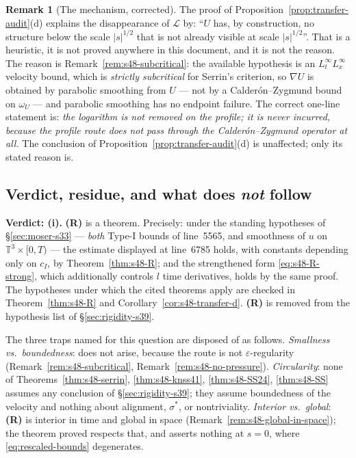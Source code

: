 \documentclass[11pt]{article}
\theoremstyle{definition}
\newtheorem{remark}[theorem]{Remark}
\theoremstyle{remark}
\newcommand{\T}{\mathbb{T}}
\begin{document}
\begin{remark}[The mechanism, corrected]\label{rem:s48-mechanism}
  The proof of Proposition~\ref{prop:transfer-audit}(d) explains the
  disappearance of $\mathcal{L}$ by: ``$U$ has, by construction, no structure
  below the scale $|s|^{1/2}$ that is not already visible at scale
  $|s|^{1/2}$''. That is a heuristic, it is not proved anywhere in this
  document, and it is not the reason. The reason is
  Remark~\ref{rem:s48-subcritical}: the available hypothesis is an
  $L^\infty_{t}L^\infty_{x}$ velocity bound, which is \emph{strictly
  subcritical} for Serrin's criterion, so $\nabla U$ is obtained by parabolic
  smoothing from $U$ --- not by a Calder\'on--Zygmund bound on $\omega_U$ ---
  and parabolic smoothing has no endpoint failure. The correct one-line
  statement is: \emph{the logarithm is not removed on the profile; it is never
  incurred, because the profile route does not pass through the
  Calder\'on--Zygmund operator at all.} The conclusion of
  Proposition~\ref{prop:transfer-audit}(d) is unaffected; only its stated
  reason is.
\end{remark}

\subsection{Verdict, residue, and what does \emph{not} follow}
\label{subsec:s48-residue}

\noindent\textbf{Verdict: (i).} \textbf{(R)} is a theorem. Precisely: under
the standing hypotheses of \S\ref{sec:moser-s33} --- \emph{both} Type-I bounds
of line~5565, and smoothness of $u$ on $\T^3\times[0,T)$ --- the estimate
displayed at line~6785 holds, with constants depending only on $c_I$, by
Theorem~\ref{thm:s48-R}; and the strengthened form
\eqref{eq:s48-R-strong}, which additionally controls $l$ time derivatives,
holds by the same proof. The hypotheses under which the cited theorems apply
are checked in Theorem~\ref{thm:s48-R} and
Corollary~\ref{cor:s48-transfer-d}. \textbf{(R)} is removed from the
hypothesis list of \S\ref{sec:rigidity-s39}.

The three traps named for this question are disposed of as follows.
\emph{Smallness vs.\ boundedness}: does not arise, because the route is not
$\varepsilon$-regularity (Remark~\ref{rem:s48-subcritical},
Remark~\ref{rem:s48-no-pressure}). \emph{Circularity}: none of
Theorems~\ref{thm:s48-serrin}, \ref{thm:s48-knss41}, \ref{thm:s48-SS24},
\ref{thm:s48-SS} assumes any conclusion of \S\ref{sec:rigidity-s39}; they
assume boundedness of the velocity and nothing about alignment, $\sigma^*$, or
nontriviality. \emph{Interior vs.\ global}: \textbf{(R)} is interior in time
and global in space (Remark~\ref{rem:s48-global-in-space}); the theorem proved
respects that, and asserts nothing at $s=0$, where
\eqref{eq:rescaled-bounds} degenerates.
\end{document}
